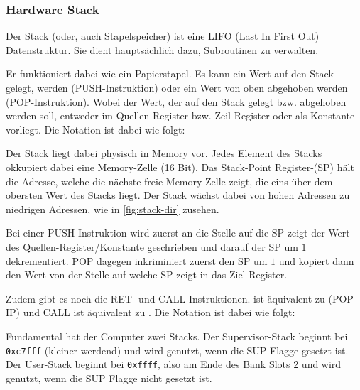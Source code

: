 \documentclass{scrartcl}
\begin{document}
\subsubsection{\label{section:stack}Hardware Stack}

Der Stack (oder, auch Stapelspeicher) ist eine LIFO (Last In First Out) Datenstruktur.
Sie dient hauptsächlich dazu, Subroutinen zu verwalten.

Er funktioniert dabei wie ein Papierstapel.
Es kann ein Wert auf den Stack gelegt, werden (PUSH-Instruktion) oder ein Wert von oben abgehoben werden (POP-Instruktion).
Wobei der Wert, der auf den Stack gelegt bzw. abgehoben werden soll, entweder im Quellen-Register bzw. Zeil-Register oder als Konstante vorliegt.
Die Notation ist dabei wie folgt:



Der Stack liegt dabei physisch in Memory vor.
Jedes Element des Stacks okkupiert dabei eine Memory-Zelle (16 Bit).
Das Stack-Point Register-(SP) hält die Adresse, welche die nächste freie Memory-Zelle zeigt, die eins über dem obersten Wert des Stacks liegt.
Der Stack wächst dabei von hohen Adressen zu niedrigen Adressen, wie in \autoref{fig:stack-dir} zusehen.

Bei einer PUSH Instruktion wird zuerst an die Stelle auf die SP zeigt der Wert des Quellen-Register/Konstante geschrieben und darauf der SP um $1$ dekrementiert.
POP dagegen inkriminiert zuerst den SP um $1$ und kopiert dann den Wert von der Stelle auf welche SP zeigt in das Ziel-Register.

Zudem gibt es noch die RET- und CALL-Instruktionen.  ist äquivalent zu \text(POP IP) und CALL ist äquivalent zu .
Die Notation ist dabei wie folgt:



Fundamental hat der Computer zwei Stacks.
Der Supervisor-Stack beginnt bei \texttt{0xc7fff} (kleiner werdend) und wird genutzt, wenn die SUP Flagge gesetzt ist.
Der User-Stack beginnt bei \texttt{0xffff}, also am Ende des Bank Slots 2 und wird genutzt, wenn die SUP Flagge nicht gesetzt ist.
\end{document}
